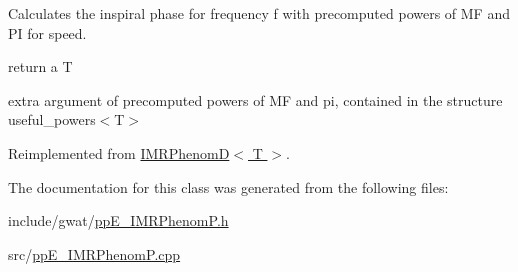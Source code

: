 Calculates the inspiral phase for frequency f with precomputed powers of MF and PI for speed. 

return a T

extra argument of precomputed powers of MF and pi, contained in the structure useful\+\_\+powers$<$\+T$>$ 

Reimplemented from \hyperlink{classIMRPhenomD_a7073ff2be22b0251ca419d0b69dd9990}{I\+M\+R\+Phenom\+D$<$ T $>$}.



The documentation for this class was generated from the following files\+:\begin{DoxyCompactItemize}
\item 
include/gwat/\hyperlink{ppE__IMRPhenomP_8h}{pp\+E\+\_\+\+I\+M\+R\+Phenom\+P.\+h}\item 
src/\hyperlink{ppE__IMRPhenomP_8cpp}{pp\+E\+\_\+\+I\+M\+R\+Phenom\+P.\+cpp}\end{DoxyCompactItemize}

